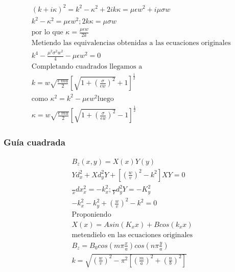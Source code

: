 \begin{subequations}
	\begin{gather}
	(k+i\kappa)^2=k^2-\kappa^2+2ik\kappa=\mu\epsilon w^2+i\mu\sigma w \nonumber \\
	k^2 - \kappa^2 = \mu \epsilon w^2 ; 2 k \kappa = \mu \sigma w \nonumber \\
	\text{por lo que } \kappa=\frac{\mu \epsilon w}{2 k}\nonumber \\
\text{Metiendo las equivalencias obtenidas a las ecuaciones originales } \\ 
	k^4 - \frac{\mu^2 \sigma^2 w^2}{4} - \mu \epsilon w^2=0 \nonumber\\
	\text{Completando cuadrados llegamos a } \nonumber \\
	 k= w \sqrt{\frac{\epsilon \ mu}{2}} [\sqrt{1+(\frac{\sigma}{\epsilon w})^2}+1]^\frac{1}{2} \\
	 \text{como } \kappa^2 = k^2 - \mu \epsilon w^2 \text{luego} \nonumber\\
	 \kappa = w \sqrt{\frac{\epsilon \ mu}{2}} [\sqrt{1+(\frac{\sigma}{\epsilon w})^2}-1]^\frac{1}{2}
	\end{gather}
\end{subequations}
\subsubsection{Guía cuadrada}
\begin{subequations}
	\begin{align}
		B_{z}(x,y)=X(x)Y(y) \nonumber \\
		Y d_{x}^2+X d_{y}^2Y + [(\frac{w}{v})^2-k^2]XY=0 \nonumber \\
		\frac{}{x} dx_{x}^2=-k_{x}^2 ; \frac{}{Y}d_{y}^2 Y = -K_{y}^2 \nonumber \\
		-k_{x}^2 - k_{y}^2+(\frac{w}{v})^2 - k^2 = 0 \nonumber\\
		\text{Proponiendo } \nonumber \\
		X(x)=A sin (K_{x} x) + B cos(k_{x}x)  \\
		\text{metendielo en las ecuaciones originales} \nonumber \\
		B_{z}=B_{0} cos(m \pi \frac{x}{a}) cos(n \pi \frac{y}{a}) \\
		k = \sqrt{(\frac{w}{v})^2-\pi^2 [(\frac{m}{a})^2+(\frac{n}{b})^2]} 
	\end{align}
\end{subequations}
